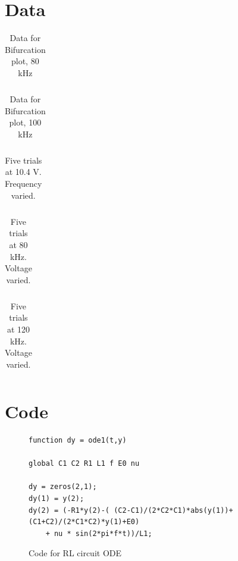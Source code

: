 \documentclass[12pt]{report}
\begin{document}
\section{Data}
\label{sec:Data}

	\begin{table}[h]
		\centering
		\begin{tabular}{|l|l|l||l|l|l|}
			\hline
			 
		\end{tabular}
		\caption{Data for Bifurcation plot, 80 kHz}
		\label{tab:80khz}
	\end{table}

	\begin{table}[h]
		\centering
		\begin{tabular}{|l|l|l|l||l|l|l|l|}
			\hline
			 
		\end{tabular}
		\caption{Data for Bifurcation plot, 100 kHz}
		\label{tab:100khz}
	\end{table}

	\begin{table}[h]
		\centering
		\begin{tabular}{|c|c|c|c|c|}
			\hline
			 
		\end{tabular}
		\caption{Five trials at 10.4 V. Frequency varied.}
		\label{tab:chaos3}
	\end{table}

	\begin{table}[h] 
		\centering
		\begin{tabular}{|l|l|l|l|l|l|l|l|l|l|l|l|}
			\hline
			 
		\end{tabular}
		\caption{Five trials at 80 kHz. Voltage varied.}
		\label{tab:chaos2}
	\end{table}
	
	\begin{table}[h]
		\centering
		\begin{tabular}{|l|l|l|l|l|l|l|l|l|l|l|l|}
			\hline
			 
		\end{tabular}
		\caption{Five trials at 120 kHz. Voltage varied.}
		\label{tab:chaos2}
	\end{table}

\section{Code}
\label{sec: Code}

\begin{figure}[h]
\begin{lstlisting}
function dy = ode1(t,y)

global C1 C2 R1 L1 f E0 nu

dy = zeros(2,1);
dy(1) = y(2);
dy(2) = (-R1*y(2)-( (C2-C1)/(2*C2*C1)*abs(y(1))+ (C1+C2)/(2*C1*C2)*y(1)+E0)
	+ nu * sin(2*pi*f*t))/L1;
\end{lstlisting}
\caption{Code for RL circuit ODE}
\label{code:ode}
\end{figure}
\end{document}
